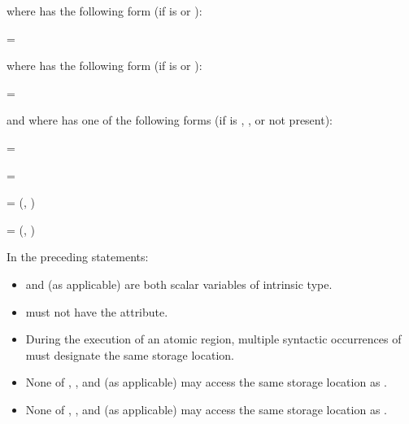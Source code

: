 \begin{fortranspecific}
where  has the following form (if 
is  or ):

\begin{indentedcodelist}
 = 
\end{indentedcodelist}

where  has the following form (if 
is  or ):

\begin{indentedcodelist}
 = 
\end{indentedcodelist}

and where  has one of the following forms (if  is ,
, or not present):

\begin{indentedcodelist}
 = 

 = 

 =  (, )

 =  (, )
\end{indentedcodelist}

In the preceding statements:

\begin{itemize}
\item {} and  (as applicable) are both scalar variables of intrinsic type.

\vspace{-2 pt} %
\item {} must not have the  attribute.

\vspace{-2 pt} %
\item During the execution of an atomic region, multiple syntactic occurrences of  must
designate the same storage location.

\vspace{-2 pt} %
\item None of , , and  (as applicable) may access the same storage location as
.

\vspace{-2 pt} %
\item None of , , and  (as applicable) may access the same storage location as
.


\end{itemize}
\end{fortranspecific}
